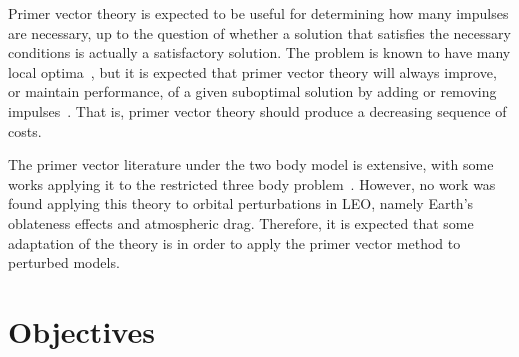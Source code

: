 Primer vector theory is expected to be useful for determining how many impulses are necessary, up to the question of whether a solution that satisfies the necessary conditions is actually a satisfactory solution. The problem is known to have many local optima~\cite{interactive_primer_vector}, but it is expected that primer vector theory will always improve, or maintain performance, of a given suboptimal solution by adding or removing impulses~\cite{Conway_2010}. That is, primer vector theory should produce a decreasing sequence of costs.

The primer vector literature under the two body model is extensive, with some works applying it to the restricted three body problem~\cite{impulsive_europa}. However, no work was found applying this theory to orbital perturbations in LEO, namely Earth's oblateness effects and atmospheric drag. Therefore, it is expected that some adaptation of the theory is in order to apply the primer vector method to perturbed models. 




\section{Objectives}

